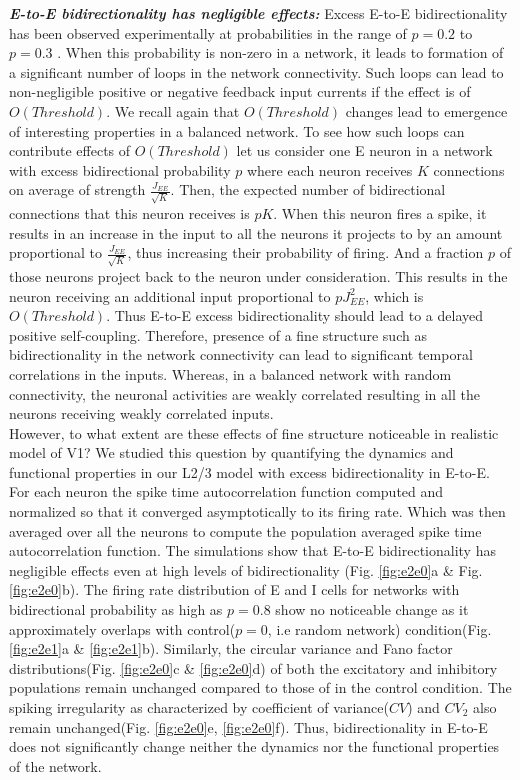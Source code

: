 \emph{\textbf{E-to-E bidirectionality has negligible effects:}} Excess E-to-E bidirectionality has been observed experimentally at probabilities in the range of $p = 0.2$ to $p = 0.3$ \cite{Song2005}. When this probability is non-zero in a network, it leads to formation of a significant number of loops in the network connectivity. Such loops can lead to non-negligible positive or negative feedback input currents if the effect is of $O(Threshold)$. We recall again that $O(Threshold)$ changes lead to emergence of interesting properties in a balanced network. To see how such loops can contribute effects of $O(Threshold)$ let us consider one E neuron in a network with excess bidirectional probability $p$ where each neuron receives $K$ connections on average of strength $\frac{J_{EE}}{\sqrt{K}}$. Then, the expected number of bidirectional connections that this neuron receives is $pK$. When this neuron fires a spike, it results in an increase in the input to all the neurons it projects to by an amount proportional to $\frac{J_{EE}}{\sqrt{K}}$, thus increasing their probability of firing. And a fraction $p$ of those neurons project back to the neuron under consideration. This results in the neuron receiving an additional input proportional to $p J_{EE}^{2}$, which is $O(Threshold)$. Thus E-to-E excess bidirectionality should lead to a delayed positive self-coupling. Therefore, presence of a fine structure such as bidirectionality in the network connectivity can lead to significant temporal correlations in the inputs. Whereas, in a balanced network with random connectivity, the neuronal activities are weakly correlated resulting in all the neurons receiving weakly correlated inputs.\\  
However, to what extent are these effects of fine structure noticeable in realistic model of V1?  We studied this question by quantifying the dynamics and functional properties in our L2/3 model with excess bidirectionality in E-to-E. For each neuron the spike time autocorrelation function computed and normalized so that it converged asymptotically to its firing rate. Which was then averaged over all the neurons  to compute the population averaged spike time autocorrelation function. The simulations show that E-to-E bidirectionality has negligible effects even at high levels of bidirectionality (Fig. \ref{fig:e2e0}a \& Fig. \ref{fig:e2e0}b). The firing rate distribution of E and I cells for networks with bidirectional probability as high as $p = 0.8$ show no noticeable change as it approximately overlaps with control($p = 0$, i.e random network) condition(Fig. \ref{fig:e2e1}a \& \ref{fig:e2e1}b). Similarly, the circular variance and Fano factor distributions(Fig. \ref{fig:e2e0}c \& \ref{fig:e2e0}d) of both the excitatory and inhibitory populations remain unchanged compared to those of in the control condition. The spiking irregularity as characterized by coefficient of variance($CV$) and $CV_2$ also remain unchanged(Fig. \ref{fig:e2e0}e, \ref{fig:e2e0}f). Thus, bidirectionality in E-to-E does not significantly change neither the dynamics nor the functional properties of the network. 

